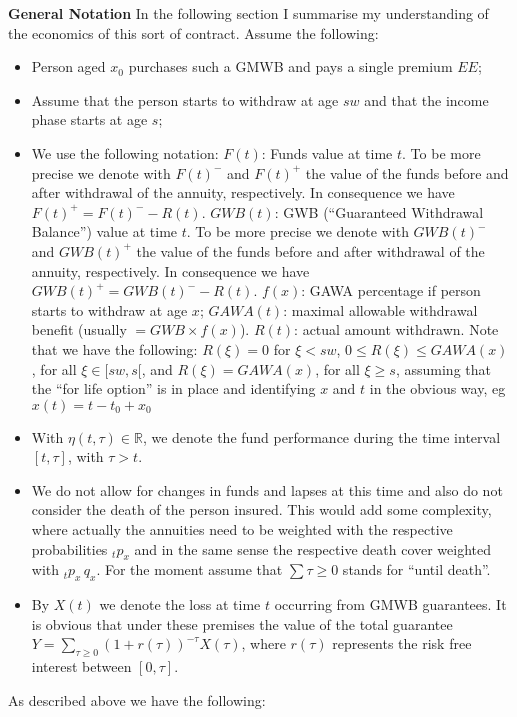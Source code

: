 \documentclass[10pt, a4paper,landscape]{article}
\begin{document}
{\bf General Notation}
In the following section I summarise my understanding of the economics of this sort of contract. Assume the following:
\begin{itemize}
\item Person aged $x_0$ purchases such a GMWB and pays a single premium $EE$;
\item Assume that the person starts to withdraw at age $sw$ and that the income phase starts at age $s$;
\item We use the following notation:
\subitem $F(t)$: Funds value at time $t$. To be more precise we denote with $F(t)^-$ and $F(t)^+$ the value of the funds before and after withdrawal of the annuity, respectively. In consequence we have $F(t)^+ =F(t)^- - R(t)$.
\subitem $GWB(t)$: GWB (``Guaranteed Withdrawal Balance'') value at time $t$. To be more precise we denote with $GWB(t)^-$ and $GWB(t)^+$ the value of the funds before and after withdrawal of the annuity, respectively. In consequence we have $GWB(t)^+ =GWB(t)^- - R(t)$.
\subitem $f(x)$: GAWA percentage if person starts to withdraw at age $x$;
\subitem $GAWA(t)$: maximal allowable withdrawal benefit (usually $=GWB \times f(x)$).
\subitem $R(t)$: actual amount withdrawn. Note that we have the following: $R(\xi) = 0$ for $\xi < sw$, $ 0 \le R(\xi) \le GAWA(x)$, for all $\xi \in [sw, s[$, and  $R(\xi) = GAWA(x)$, for all $\xi \ge s$, assuming that the ``for life option'' is in place and identifying $x$ and $t$ in the obvious way, eg $x(t) = t-t_0 + x_0$  
\item With $\eta(t,\tau) \in \mathbb{R}$, we denote the fund performance during the time interval $[t,\tau]$, with $\tau > t$.
\item We do not allow for changes in funds and lapses at this time and also do not consider the death of the person insured. This would add some complexity, where actually the annuities need to be weighted with the respective probabilities ${}_tp_{x}$ and in the same sense the respective death cover weighted with ${}_tp_x \, q_x$. For the moment assume that $\sum{\tau \ge 0}$ stands for ``until death''. 
\item By $X(t)$ we denote the loss at time $t$ occurring from GMWB guarantees. It is obvious that under these premises the value of the total guarantee $Y = \sum_{\tau \ge 0} (1+r(\tau))^{-\tau} X(\tau) $, where $r(\tau)$ represents the risk free interest between $[0,\tau]$.
\end{itemize}

As described above we have the following:
\end{document}
